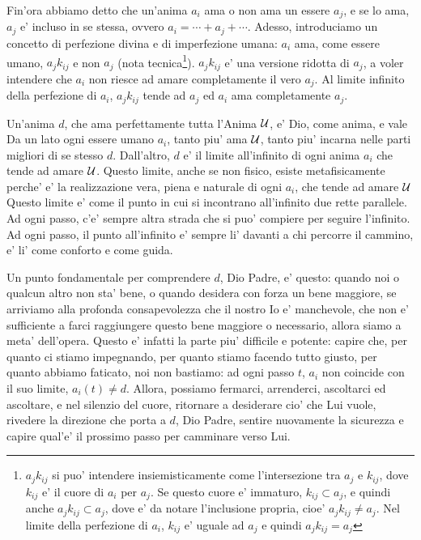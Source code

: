 Fin'ora abbiamo detto che un'anima $a_i$ ama o non ama un essere $a_j$, e se lo ama, $a_j$ e' incluso in se stessa, ovvero $a_i=\cdots+a_j+\cdots$. Adesso, introduciamo un concetto di perfezione divina e di imperfezione umana: $a_i$ ama, come essere umano, $a_jk_{ij}$ e non $a_j$ (nota tecnica\footnote{$a_jk_{ij}$ si puo' intendere insiemisticamente come l'intersezione tra $a_j$ e $k_{ij}$, dove $k_{ij}$ e' il cuore di $a_i$ per $a_j$. Se questo cuore e' immaturo, $k_{ij} \subset a_j$, e quindi anche $a_jk_{ij}\subset a_j$, dove e' da notare l'inclusione propria, cioe' $a_jk_{ij}\ne a_j$. Nel limite della perfezione di $a_i$, $k_{ij}$ e' uguale ad $a_j$ e quindi $a_jk_{ij}=a_j$}). $a_jk_{ij}$ e' una versione ridotta di $a_j$, a voler intendere che $a_i$ non riesce ad amare completamente il vero $a_j$. Al limite infinito della perfezione di $a_i$, $a_jk_{ij}$ tende ad $a_j$ ed $a_i$ ama completamente $a_j$.

Un'anima $d$, che ama perfettamente tutta l'Anima $\mathcal{U}$, e' Dio, come anima, e vale 
Da un lato ogni essere umano $a_i$, tanto piu' ama $\mathcal{U}$, tanto piu' incarna nelle parti migliori di se stesso $d$. Dall'altro, $d$ e' il limite all'infinito di ogni anima $a_i$ che tende ad amare $\mathcal{U}$. Questo limite, anche se non fisico, esiste metafisicamente perche' e' la realizzazione vera, piena e naturale di ogni $a_i$, che tende ad amare $\mathcal{U}$
Questo limite e' come il punto in cui si incontrano all'infinito due rette parallele. Ad ogni passo, c'e' sempre altra strada che si puo' compiere per seguire l'infinito. Ad ogni passo, il punto all'infinito e' sempre li' davanti a chi percorre il cammino, e' li' come conforto e come guida.

Un punto fondamentale per comprendere $d$, Dio Padre, e' questo: quando noi o qualcun altro non sta' bene, o quando desidera con forza un bene maggiore, se arriviamo alla profonda consapevolezza che il nostro Io e' manchevole, che non e' sufficiente a farci raggiungere questo bene maggiore o necessario, allora siamo a meta' dell'opera. Questo e' infatti la parte piu' difficile e potente: capire che, per quanto ci stiamo impegnando, per quanto stiamo facendo tutto giusto, per quanto abbiamo faticato, noi non bastiamo: ad ogni passo $t$, $a_i$ non coincide con il suo limite, $a_i(t) \ne d$. Allora, possiamo fermarci, arrenderci, ascoltarci ed ascoltare, e nel silenzio del cuore, ritornare a desiderare cio' che Lui vuole, rivedere la direzione che porta a $d$, Dio Padre, sentire nuovamente la sicurezza e capire qual'e' il prossimo passo per camminare verso Lui.

